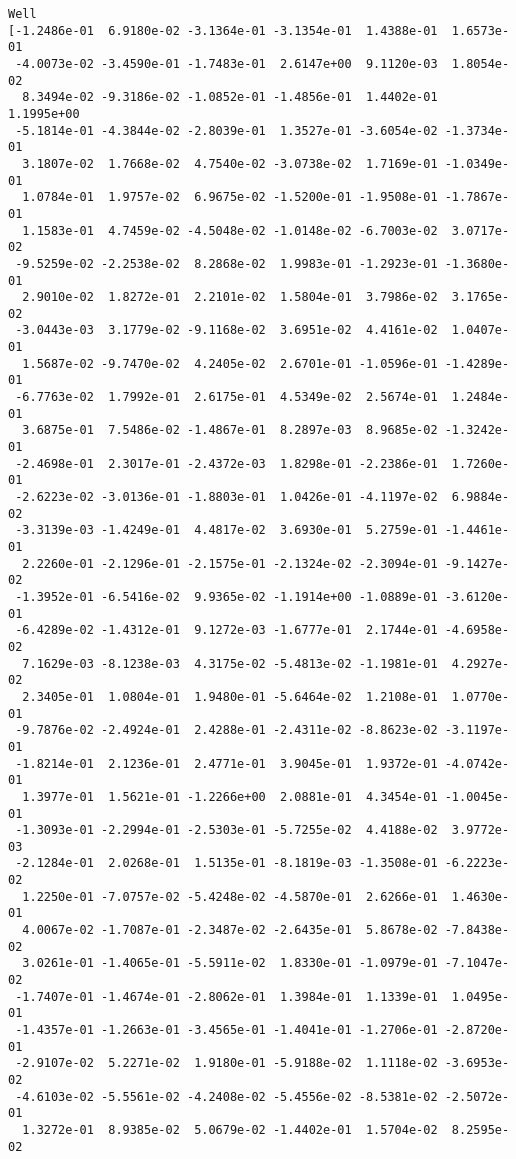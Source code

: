 \documentclass[11pt]{article}
\begin{document}
    \begin{Verbatim}[commandchars=\\\{\}]
Well
[-1.2486e-01  6.9180e-02 -3.1364e-01 -3.1354e-01  1.4388e-01  1.6573e-01
 -4.0073e-02 -3.4590e-01 -1.7483e-01  2.6147e+00  9.1120e-03  1.8054e-02
  8.3494e-02 -9.3186e-02 -1.0852e-01 -1.4856e-01  1.4402e-01  1.1995e+00
 -5.1814e-01 -4.3844e-02 -2.8039e-01  1.3527e-01 -3.6054e-02 -1.3734e-01
  3.1807e-02  1.7668e-02  4.7540e-02 -3.0738e-02  1.7169e-01 -1.0349e-01
  1.0784e-01  1.9757e-02  6.9675e-02 -1.5200e-01 -1.9508e-01 -1.7867e-01
  1.1583e-01  4.7459e-02 -4.5048e-02 -1.0148e-02 -6.7003e-02  3.0717e-02
 -9.5259e-02 -2.2538e-02  8.2868e-02  1.9983e-01 -1.2923e-01 -1.3680e-01
  2.9010e-02  1.8272e-01  2.2101e-02  1.5804e-01  3.7986e-02  3.1765e-02
 -3.0443e-03  3.1779e-02 -9.1168e-02  3.6951e-02  4.4161e-02  1.0407e-01
  1.5687e-02 -9.7470e-02  4.2405e-02  2.6701e-01 -1.0596e-01 -1.4289e-01
 -6.7763e-02  1.7992e-01  2.6175e-01  4.5349e-02  2.5674e-01  1.2484e-01
  3.6875e-01  7.5486e-02 -1.4867e-01  8.2897e-03  8.9685e-02 -1.3242e-01
 -2.4698e-01  2.3017e-01 -2.4372e-03  1.8298e-01 -2.2386e-01  1.7260e-01
 -2.6223e-02 -3.0136e-01 -1.8803e-01  1.0426e-01 -4.1197e-02  6.9884e-02
 -3.3139e-03 -1.4249e-01  4.4817e-02  3.6930e-01  5.2759e-01 -1.4461e-01
  2.2260e-01 -2.1296e-01 -2.1575e-01 -2.1324e-02 -2.3094e-01 -9.1427e-02
 -1.3952e-01 -6.5416e-02  9.9365e-02 -1.1914e+00 -1.0889e-01 -3.6120e-01
 -6.4289e-02 -1.4312e-01  9.1272e-03 -1.6777e-01  2.1744e-01 -4.6958e-02
  7.1629e-03 -8.1238e-03  4.3175e-02 -5.4813e-02 -1.1981e-01  4.2927e-02
  2.3405e-01  1.0804e-01  1.9480e-01 -5.6464e-02  1.2108e-01  1.0770e-01
 -9.7876e-02 -2.4924e-01  2.4288e-01 -2.4311e-02 -8.8623e-02 -3.1197e-01
 -1.8214e-01  2.1236e-01  2.4771e-01  3.9045e-01  1.9372e-01 -4.0742e-01
  1.3977e-01  1.5621e-01 -1.2266e+00  2.0881e-01  4.3454e-01 -1.0045e-01
 -1.3093e-01 -2.2994e-01 -2.5303e-01 -5.7255e-02  4.4188e-02  3.9772e-03
 -2.1284e-01  2.0268e-01  1.5135e-01 -8.1819e-03 -1.3508e-01 -6.2223e-02
  1.2250e-01 -7.0757e-02 -5.4248e-02 -4.5870e-01  2.6266e-01  1.4630e-01
  4.0067e-02 -1.7087e-01 -2.3487e-02 -2.6435e-01  5.8678e-02 -7.8438e-02
  3.0261e-01 -1.4065e-01 -5.5911e-02  1.8330e-01 -1.0979e-01 -7.1047e-02
 -1.7407e-01 -1.4674e-01 -2.8062e-01  1.3984e-01  1.1339e-01  1.0495e-01
 -1.4357e-01 -1.2663e-01 -3.4565e-01 -1.4041e-01 -1.2706e-01 -2.8720e-01
 -2.9107e-02  5.2271e-02  1.9180e-01 -5.9188e-02  1.1118e-02 -3.6953e-02
 -4.6103e-02 -5.5561e-02 -4.2408e-02 -5.4556e-02 -8.5381e-02 -2.5072e-01
  1.3272e-01  8.9385e-02  5.0679e-02 -1.4402e-01  1.5704e-02  8.2595e-02

\end{Verbatim}
\end{document}
